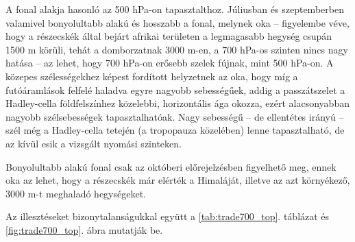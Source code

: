 \documentclass[12pt,a4paper]{article}
\begin{document}
A fonal alakja hasonló az 500 hPa-on tapasztalthoz. Júliusban és szeptemberben valamivel bonyolultabb alakú és hosszabb a fonal, melynek oka -- figyelembe véve, hogy a részecskék által bejárt afrikai területen a legmagasabb hegység csupán 1500 m körüli, tehát a domborzatnak 3000 m-en, a 700 hPa-os szinten nincs nagy hatása -- az lehet, hogy 700 hPa-on erősebb szelek fújnak, mint 500 hPa-on. A közepes szélességekhez képest fordított helyzetnek az oka, hogy míg a futóáramlások felfelé haladva egyre nagyobb sebességűek, addig a passzátszelet a Hadley-cella földfelszínhez közelebbi, horizontális ága okozza, ezért alacsonyabban nagyobb szélsebességek tapasztalhatóak. Nagy sebességű -- de ellentétes irányú -- szél még a Hadley-cella tetején (a tropopauza közelében) lenne tapasztalható, de az kívül esik a vizsgált nyomási szinteken. 

Bonyolultabb alakú fonal csak az októberi előrejelzésben figyelhető meg, ennek oka az lehet, hogy a részecskék már elérték a Himaláját, illetve az azt környékező, 3000 m-t meghaladó hegységeket.

Az illesztéseket bizonytalanságukkal együtt a \ref{tab:trade700_top}. táblázat és \ref{fig:trade700_top}. ábra mutatják be.
\end{document}
